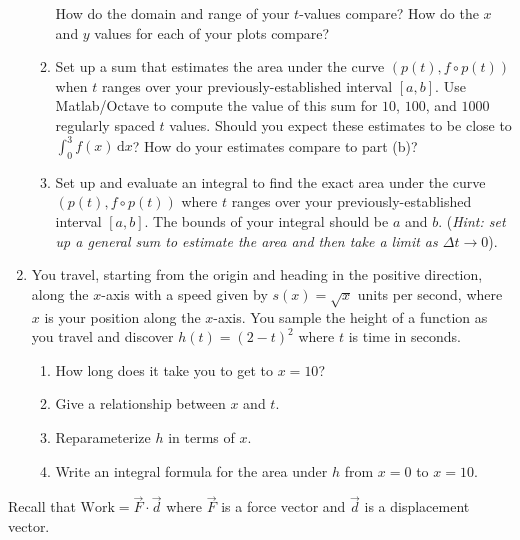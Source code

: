 \documentclass[letter]{article}
\renewcommand{\d}{\mathrm{d}}
\begin{document}
\begin{enumerate}
\begin{enumerate}
					How do the domain and range of your $t$-values compare?
					How do the $x$ and $y$ values for each of your plots compare?
				\item Set up a sum that estimates the area under the curve $(p(t), f\circ p(t))$
					when $t$ ranges over your previously-established interval $[a,b]$.  Use
					{\sc Matlab}/{\sc Octave} to compute the value of this sum for
					$10$, $100$, and $1000$ regularly spaced $t$ values.  Should you
					expect these estimates to be close to $\displaystyle \int_0^3 f(x)\,\d x$?
					How do your estimates compare to part (b)?
				\item Set up and evaluate an integral to find the exact area under the curve $(p(t),f\circ p(t))$
					where $t$ ranges over your previously-established interval $[a,b]$.
					The bounds of your integral should be $a$ and $b$.
					(\emph{Hint: set up a general sum to estimate the area and then take
					a limit as $\Delta t\to 0$}).
			\end{enumerate}
		\item You travel, starting from the origin and heading in the positive direction, along the
			$x$-axis with a speed given by $s(x)=\sqrt{x}$ units per second, where $x$ is your position along
			the $x$-axis.  You sample the height of a function as you travel and discover
			$h(t)=(2-t)^2$ where $t$ is time in seconds.
			\begin{enumerate}
				\item How long does it take you to get to $x=10$?
				\item Give a relationship between $x$ and $t$.
				\item Reparameterize $h$ in terms of $x$.
				\item Write an integral formula for the area under $h$ from $x=0$ to $x=10$.
			\end{enumerate}
	\end{enumerate}

	
	Recall that $\text{Work}=\vec F\cdot \vec d$ where $\vec F$ is a force vector and
	$\vec d$ is a displacement vector.
	
\end{document}
